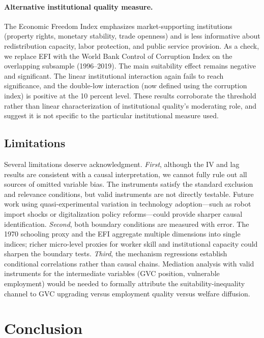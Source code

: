 \documentclass[12pt]{article}
\begin{document}
\paragraph{Alternative institutional quality measure.}
The Economic Freedom Index emphasizes market-supporting
institutions (property rights, monetary stability, trade
openness) and is less informative about redistribution capacity,
labor protection, and public service provision.
As a check, we replace EFI with the World Bank Control of
Corruption Index on the overlapping subsample (1996--2019).
The main suitability effect remains negative and significant.
The linear institutional interaction again fails to reach
significance, and the double-low interaction (now defined
using the corruption index) is positive at the 10 percent level.
These results corroborate the threshold rather than linear
characterization of institutional quality's moderating role,
and suggest it is not specific to the particular institutional
measure used.

\subsection{Limitations}

Several limitations deserve acknowledgment.
\emph{First}, although the IV and lag results are consistent
with a causal interpretation, we cannot fully rule out all
sources of omitted variable bias.
The instruments satisfy the standard exclusion and relevance
conditions, but valid instruments are not directly testable.
Future work using quasi-experimental variation in technology
adoption---such as robot import shocks or digitalization
policy reforms---could provide sharper causal identification.
\emph{Second}, both boundary conditions are measured with
error.
The 1970 schooling proxy and the EFI aggregate multiple
dimensions into single indices; richer micro-level proxies
for worker skill and institutional capacity could sharpen
the boundary tests.
\emph{Third}, the mechanism regressions establish conditional
correlations rather than causal chains.
Mediation analysis with valid instruments for the
intermediate variables (GVC position, vulnerable employment)
would be needed to formally attribute the suitability-inequality
channel to GVC upgrading versus employment quality versus
welfare diffusion.

\section{Conclusion}
\label{sec:conclusion}
\end{document}
